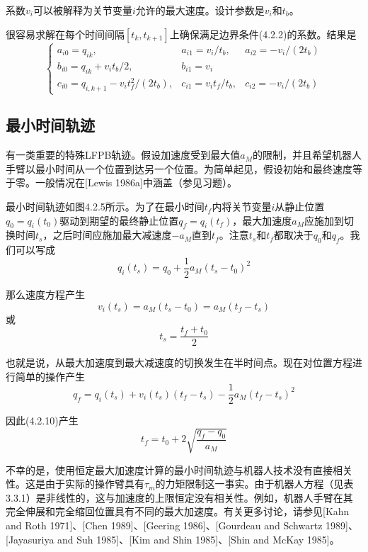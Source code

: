 \documentclass[UTF8]{ctexart}
\theoremstyle{definition}
\begin{document}
系数$v_i$可以被解释为关节变量$i$允许的最大速度。设计参数是$v_i$和$t_b$。

很容易求解在每个时间间隔$[t_k, t_{k+1}]$上确保满足边界条件(4.2.2)的系数。结果是
\begin{equation}
    \begin{cases}
        a_{i0} = q_{ik}, & a_{i1} = v_i/t_b, & a_{i2} = -v_i/(2t_b) \\
        b_{i0} = q_{ik} + v_it_b/2, & b_{i1} = v_i \\
        c_{i0} = q_{i,k+1} - v_it_f^2/(2t_b), & c_{i1} = v_it_f/t_b, & c_{i2} = -v_i/(2t_b)
    \end{cases}
\end{equation}

\subsection{最小时间轨迹}

有一类重要的特殊LFPB轨迹。假设加速度受到最大值$a_M$的限制，并且希望机器人手臂以最小时间从一个位置到达另一个位置。为简单起见，假设初始和最终速度等于零。一般情况在[Lewis 1986a]中涵盖（参见习题）。

最小时间轨迹如图4.2.5所示。为了在最小时间$t_f$内将关节变量$i$从静止位置$q_0 = q_i(t_0)$驱动到期望的最终静止位置$q_f = q_i(t_f)$，最大加速度$a_M$应施加到切换时间$t_s$，之后时间应施加最大减速度$-a_M$直到$t_f$。注意$t_s$和$t_f$都取决于$q_0$和$q_f$。我们可以写成
\begin{equation}
    q_i(t_s) = q_0 + \frac{1}{2}a_M(t_s - t_0)^2
\end{equation}

那么速度方程产生
\begin{equation}
    v_i(t_s) = a_M(t_s - t_0) = a_M(t_f - t_s)
\end{equation}
或
\begin{equation}
    t_s = \frac{t_f + t_0}{2}
\end{equation}

也就是说，从最大加速度到最大减速度的切换发生在半时间点。现在对位置方程进行简单的操作产生
\begin{equation}
    q_f = q_i(t_s) + v_i(t_s)(t_f - t_s) - \frac{1}{2}a_M(t_f - t_s)^2
\end{equation}

因此(4.2.10)产生
\begin{equation}
    t_f = t_0 + 2\sqrt{\frac{q_f - q_0}{a_M}}
\end{equation}

不幸的是，使用恒定最大加速度计算的最小时间轨迹与机器人技术没有直接相关性。这是由于实际的操作臂具有$\tau_m$的力矩限制这一事实。由于机器人方程（见表3.3.1）是非线性的，这与加速度的上限恒定没有相关性。例如，机器人手臂在其完全伸展和完全缩回位置具有不同的最大加速度。有关更多讨论，请参见[Kahn and Roth 1971]、[Chen 1989]、[Geering 1986]、[Gourdeau and Schwartz 1989]、[Jayasuriya and Suh 1985]、[Kim and Shin 1985]、[Shin and McKay 1985]。
\end{document}
